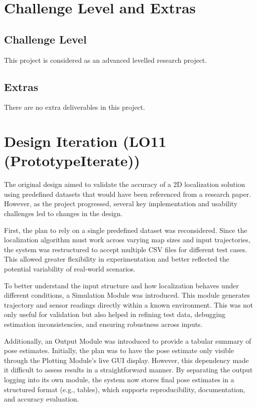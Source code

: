 \documentclass{article}
\begin{document}
\section{Challenge Level and Extras}

\subsection{Challenge Level}

This project is considered as an advanced levelled research project.

\subsection{Extras}

There are no extra deliverables in this project.

\section{Design Iteration (LO11 (PrototypeIterate))}

The original design aimed to validate the accuracy of a 2D localization solution using predefined datasets that would have been referenced from a research paper. However, as the project progressed, several key implementation and usability challenges led to changes in the design.

First, the plan to rely on a single predefined dataset was reconsidered. Since the localization algorithm must work across varying map sizes and input trajectories, the system was restructured to accept multiple CSV files for different test cases. This allowed greater flexibility in experimentation and better reflected the potential variability of real-world scenarios.

To better understand the input structure and how localization behaves under different conditions, a Simulation Module was introduced. This module generates trajectory and sensor readings directly within a known environment. This was not only useful for validation but also helped in refining test data, debugging estimation inconsistencies, and ensuring robustness across inputs.

Additionally, an Output Module was introduced to provide a tabular summary of pose estimates. Initially, the plan was to have the pose estimate only visible through the Plotting Module's live GUI display. However, this dependency made it difficult to assess results in a straightforward manner. By separating the output logging into its own module, the system now stores final pose estimates in a structured format (e.g., tables), which supports reproducibility, documentation, and accuracy evaluation.
\end{document}
